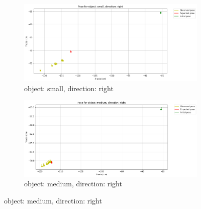 \documentclass[10pt,a4paper]{article}
\begin{document}
\begin{itemize}
								\begin{figure}[H]
									\begin{subfigure}{0.5\textwidth}
										\centering
										\includegraphics[width=0.8\linewidth]{img/pose_small_right.png}
										\caption{object: small, direction: right}
										\label{fig:object: small, direction: right}
									\end{subfigure}%
									\begin{subfigure}{0.5\textwidth}
										\centering
										\includegraphics[width=0.8\linewidth]{img/pose_medium_right.png}
										\caption{object: medium, direction: right}
										\label{fig:object: medium, direction: right}
									\end{subfigure}
									

\end{figure}
\end{itemize}
\end{document}

